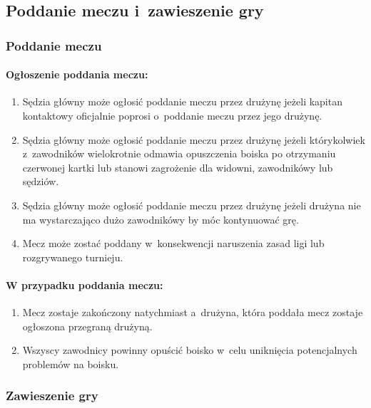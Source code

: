\documentclass[12pt,a4paper]{article}
\begin{document}
\subsection{Poddanie meczu i~zawieszenie gry}

\subsubsection{Poddanie meczu}

\paragraph{Ogłoszenie poddania meczu:}

\begin{enumerate}
	\item
	      Sędzia główny może ogłosić poddanie meczu przez drużynę jeżeli kapitan
	      kontaktowy oficjalnie poprosi o~poddanie meczu przez jego drużynę.
	\item
	      Sędzia główny może ogłosić poddanie meczu przez drużynę jeżeli
	      którykolwiek z~zawodników wielokrotnie odmawia opuszczenia boiska po
	      otrzymaniu czerwonej kartki lub stanowi zagrożenie dla widowni,
	      zawodnikówy lub sędziów.
	\item
	      Sędzia główny może ogłosić poddanie meczu przez drużynę jeżeli drużyna
	      nie ma wystarczająco dużo zawodnikówy by móc kontynuować grę.
	\item
	      Mecz może zostać poddany w~konsekwencji naruszenia zasad ligi lub
	      rozgrywanego turnieju.
\end{enumerate}

\paragraph{W przypadku poddania meczu:}

\begin{enumerate}
	\item
	      Mecz zostaje zakończony natychmiast a~drużyna, która poddała mecz
	      zostaje ogłoszona przegraną drużyną.
	\item
	      Wszyscy zawodnicy powinny opuścić boisko w~celu uniknięcia
	      potencjalnych problemów na boisku.
\end{enumerate}

\subsubsection{Zawieszenie gry}
\end{document}
